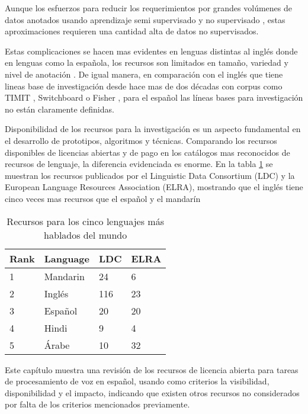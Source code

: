 \documentclass[a4paper,12pt,twoside]{report}
\begin{document}
Aunque los esfuerzos para reducir los requerimientos por grandes volúmenes de datos anotados usando aprendizaje semi supervisado \cite{AmazonSemiSupervised} y no supervisado \cite{ZeroResources}, estas aproximaciones requieren una cantidad alta de datos no supervisados.

Estas complicaciones se hacen mas evidentes en lenguas distintas al inglés donde en lenguas como la española, los recursos son limitados en tamaño, variedad y nivel de anotación \cite{HernndezMena2017}. De igual manera, en comparación con el inglés que  tiene lineas base de investigación desde hace mas de dos décadas con corpus como TIMIT \cite{TIMIT}, Switchboard \cite{Switchboard} o Fisher \cite{Fisher}, para el español las líneas bases para investigación no están claramente definidas.

Disponibilidad de los recursos para la investigación es un aspecto fundamental en el desarrollo de prototipos, algoritmos y técnicas. Comparando los recursos disponibles de licencias abiertas y de pago en los catálogos mas reconocidos de recursos de lenguaje, la diferencia evidenciada es enorme. En la tabla \ref{tab:resources_by_langauge} se muestran los recursos publicados por el Linguistic Data Consortium (LDC) y la European Language Resources Association (ELRA), mostrando que el inglés tiene cinco veces mas recursos que el español y el mandarín

\begin{table}[h]
\caption{Recursos para los cinco lenguajes más hablados del mundo \cite{HernndezMena2017}}
\label{tab:resources_by_langauge}
\begin{tabular}{|l|l|l|l|}
\hline
Rank & Language & LDC & ELRA \\ \hline
1    & Mandarin & 24  & 6    \\ \hline
2    & Inglés  & 116 & 23   \\ \hline
3    & Español  & 20  & 20   \\ \hline
4    & Hindi    & 9   & 4    \\ \hline
5    & Árabe   & 10  & 32   \\ \hline
\end{tabular}
\end{table}

Este capítulo muestra una revisión de los recursos de licencia abierta para tareas de procesamiento de voz en español, usando como criterios la visibilidad, disponibilidad y el impacto, indicando que existen otros recursos no considerados por falta de los criterios mencionados previamente.
\end{document}
